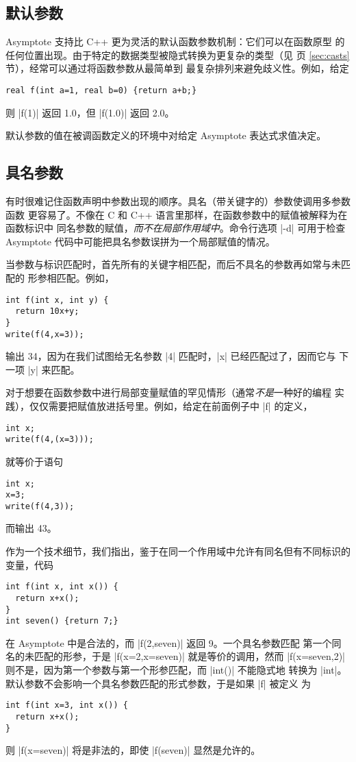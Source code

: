 \documentclass{ctexbook}
\newcommand*\prgname[1]{\textsf{#1}}
\begin{document}
{{{\subsection{默认参数}

\prgname{Asymptote} 支持比 C++ 更为灵活的默认函数参数机制：它们可以在函数原型
的任何位置出现。由于特定的数据类型被隐式转换为更复杂的类型（见
\pageref{sec:casts} 页 \ref{sec:casts} 节），经常可以通过将函数参数从最简单到
最复杂排列来避免歧义性。例如，给定
\begin{lstlisting}
real f(int a=1, real b=0) {return a+b;}
\end{lstlisting}
则 |f(1)| 返回 1.0，但 |f(1.0)| 返回 2.0。

默认参数的值在被调函数定义的环境中对给定 \prgname{Asymptote} 表达式求值决定。

\subsection{具名参数}

有时很难记住函数声明中参数出现的顺序。具名（带关键字的）参数使调用多参数函数
更容易了。不像在 C 和 C++ 语言里那样，在函数参数中的赋值被解释为在函数标识中
同名参数的赋值，\emph{而不在局部作用域中}。命令行选项 |-d| 可用于检查
\prgname{Asymptote} 代码中可能把具名参数误拼为一个局部赋值的情况。

当参数与标识匹配时，首先所有的关键字相匹配，而后不具名的参数再如常与未匹配的
形参相匹配。例如，
\begin{lstlisting}
int f(int x, int y) {
  return 10x+y;
}
write(f(4,x=3));
\end{lstlisting}
输出 34，因为在我们试图给无名参数 |4| 匹配时，|x| 已经匹配过了，因而它与
下一项 |y| 来匹配。

对于想要在函数参数中进行局部变量赋值的罕见情形（通常\emph{不是}一种好的编程
实践），仅仅需要把赋值放进括号里。例如，给定在前面例子中 |f| 的定义，
\begin{lstlisting}
int x;
write(f(4,(x=3)));
\end{lstlisting}
就等价于语句
\begin{lstlisting}
int x;
x=3;
write(f(4,3));
\end{lstlisting}
而输出 43。

作为一个技术细节，我们指出，鉴于在同一个作用域中允许有同名但有不同标识的
变量，代码
\begin{lstlisting}
int f(int x, int x()) {
  return x+x();
}
int seven() {return 7;}
\end{lstlisting}
在 \prgname{Asymptote} 中是合法的，而 |f(2,seven)| 返回 9。一个具名参数匹配
第一个同名的未匹配的形参，于是 |f(x=2,x=seven)| 就是等价的调用，然而
|f(x=seven,2)| 则不是，因为第一个参数与第一个形参匹配，而 |int()| 不能隐式地
转换为 |int|。默认参数不会影响一个具名参数匹配的形式参数，于是如果 |f| 被定义
为
\begin{lstlisting}
int f(int x=3, int x()) {
  return x+x();
}
\end{lstlisting}
则 |f(x=seven)| 将是非法的，即使 |f(seven)| 显然是允许的。

}}}
\end{document}
